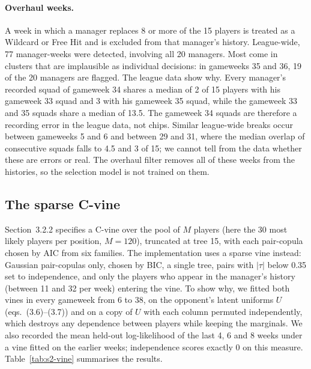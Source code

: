 \paragraph{Overhaul weeks.} A week in which a manager replaces 8 or more of the 15 players is
treated as a Wildcard or Free Hit and is excluded from that manager's history. League-wide, 77
manager-weeks were detected, involving all 20 managers. Most come in clusters that are
implausible as individual decisions: in gameweeks 35 and 36, 19 of the 20 managers are flagged.
The league data show why. Every manager's recorded squad of gameweek 34 shares a median of 2 of
15 players with his gameweek 33 squad and 3 with his gameweek 35 squad, while the gameweek 33 and
35 squads share a median of 13.5. The gameweek 34 squads are therefore a recording error in
the league data, not chips. Similar league-wide breaks occur between gameweeks 5 and 6 and
between 29 and 31, where the median overlap of consecutive squads falls to 4.5 and 3 of 15; we
cannot tell from the data whether these are errors or real. The overhaul filter removes all
of these weeks from the histories, so the selection model is not trained on them.

\subsection{The sparse C-vine}
\label{sec:s2-vine}

Section~3.2.2 specifies a C-vine over the pool of $M$ players (here the 30 most likely
players per position, $M=120$), truncated at tree 15, with each pair-copula chosen by AIC from
six families. The implementation uses a sparse vine instead: Gaussian pair-copulas only, chosen
by BIC, a single tree, pairs with $|\tau|$ below 0.35 set to independence, and only the players
who appear in the manager's history (between 11 and 32 per week) entering the vine. To show why,
we fitted both vines in every gameweek from 6 to 38, on the opponent's latent uniforms $U$
(eqs.~(3.6)--(3.7)) and on a copy of $U$ with each column permuted independently, which destroys
any dependence between players while keeping the marginals. We also recorded the mean held-out
log-likelihood of the last 4, 6 and 8 weeks under a vine fitted on the earlier weeks;
independence scores exactly 0 on this measure. Table~\ref{tab:s2-vine} summarises the results.

